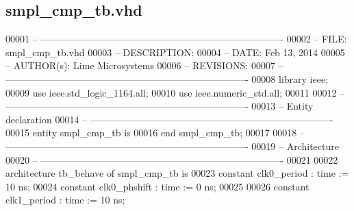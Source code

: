 \subsection{smpl\+\_\+cmp\+\_\+tb.\+vhd}
\label{smpl__cmp__tb_8vhd_source}

\begin{DoxyCode}
00001 \textcolor{keyword}{-- ---------------------------------------------------------------------------- }
00002 \textcolor{keyword}{-- FILE:    smpl\_cmp\_tb.vhd}
00003 \textcolor{keyword}{-- DESCRIPTION: }
00004 \textcolor{keyword}{-- DATE:    Feb 13, 2014}
00005 \textcolor{keyword}{-- AUTHOR(s):   Lime Microsystems}
00006 \textcolor{keyword}{-- REVISIONS:}
00007 \textcolor{keyword}{-- ---------------------------------------------------------------------------- }
00008 \textcolor{vhdlkeyword}{library }\textcolor{keywordflow}{ieee};
00009 \textcolor{vhdlkeyword}{use }ieee.std\_logic\_1164.\textcolor{keywordflow}{all};
00010 \textcolor{vhdlkeyword}{use }ieee.numeric\_std.\textcolor{keywordflow}{all};
00011 
00012 \textcolor{keyword}{-- ----------------------------------------------------------------------------}
00013 \textcolor{keyword}{-- Entity declaration}
00014 \textcolor{keyword}{-- ----------------------------------------------------------------------------}
00015 \textcolor{keywordflow}{entity }smpl_cmp_tb \textcolor{keywordflow}{is}
00016 \textcolor{keywordflow}{end} \textcolor{vhdlchar}{smpl\_cmp\_tb};
00017 
00018 \textcolor{keyword}{-- ----------------------------------------------------------------------------}
00019 \textcolor{keyword}{-- Architecture}
00020 \textcolor{keyword}{-- ----------------------------------------------------------------------------}
00021 
00022 \textcolor{keywordflow}{architecture} tb\_behave \textcolor{keywordflow}{of} smpl_cmp_tb is
00023    \textcolor{keywordflow}{constant} \textcolor{vhdlchar}{clk0_period}    \textcolor{vhdlchar}{:} \textcolor{comment}{time} \textcolor{vhdlchar}{:=} \textcolor{vhdllogic}{}\textcolor{vhdllogic}{10} \textcolor{vhdlchar}{ns};
00024    \textcolor{keywordflow}{constant} \textcolor{vhdlchar}{clk0_phshift}   \textcolor{vhdlchar}{:} \textcolor{comment}{time} \textcolor{vhdlchar}{:=} \textcolor{vhdllogic}{}\textcolor{vhdllogic}{0} \textcolor{vhdlchar}{ns};
00025    
00026    \textcolor{keywordflow}{constant} \textcolor{vhdlchar}{clk1_period}    \textcolor{vhdlchar}{:} \textcolor{comment}{time} \textcolor{vhdlchar}{:=} \textcolor{vhdllogic}{}\textcolor{vhdllogic}{10} \textcolor{vhdlchar}{ns};

\end{DoxyCode}
